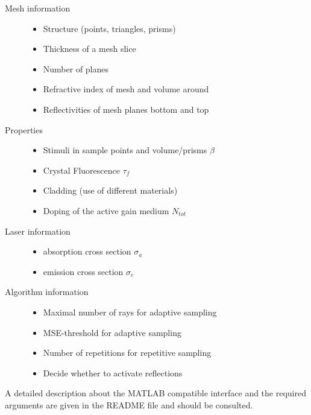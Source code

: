 \begin{description}
\label{label:input}
  \item[Mesh information]\mbox{}
    \begin{itemize}
      \setlength{\itemindent}{-2.5em}
    \item Structure (points, triangles, prisms)
    \item Thickness of a mesh slice 
    \item Number of planes
    \item Refractive index of mesh and volume around
    \item Reflectivities of mesh planes bottom and top
    \end{itemize}

  \item[Properties]
    \mbox{}
    \begin{itemize}
      \setlength{\itemindent}{-2.5em}
      \item Stimuli in sample points and volume/prisms $\beta$
      \item Crystal Fluorescence $\tau_{f}$
      \item Cladding (use of different materials)
      \item Doping of the active gain medium $N_{tot}$
    \end{itemize}

  \item[Laser information]
    \mbox{}
    \begin{itemize}
      \setlength{\itemindent}{-2.5em}
      \item absorption cross section $\sigma_a$
      \item emission cross section $\sigma_e$
    \end{itemize}

   \item[Algorithm information]
    \mbox{}
    \begin{itemize}
      \setlength{\itemindent}{-2.5em}
       \item Maximal number of rays for adaptive sampling
       \item MSE-threshold for adaptive sampling
       \item Number of repetitions for repetitive sampling
       \item Decide whether to activate reflections
     \end{itemize}
    
 \end{description}
A detailed description about the MATLAB compatible interface
and the required arguments are given in the README file 
and should be consulted.

